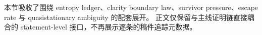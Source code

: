\documentclass[../../../main.tex]{subfiles}
\begin{document}

\begin{remark}
本节吸收了围绕 entropy ledger、clarity boundary law、survivor pressure、escape rate 与 quasistationary ambiguity 的配套展开。
正文仅保留与主线证明链直接耦合的 statement-level 接口，不再展示逐条的稿件追踪元数据。
\end{remark}
\end{document}
